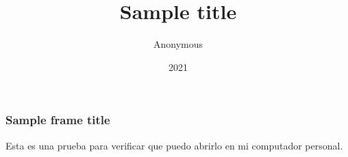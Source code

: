 \documentclass{beamer}
\title{Sample title}
\author{Anonymous}
\institute{Overleaf}
\date{2021}
\begin{document}
\frame{\titlepage}    

\begin{frame}
\frametitle{Sample frame title}
Esta es una prueba para verificar que puedo abrirlo en mi computador personal.
\end{frame}
\end{document}
